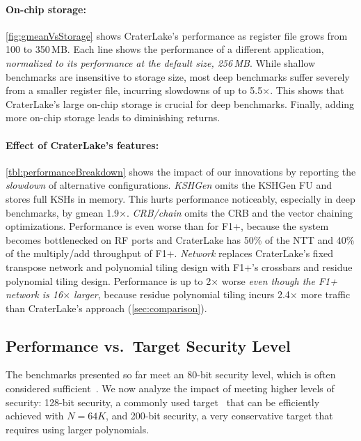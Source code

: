\paragraph{On-chip storage:}
\autoref{fig:gmeanVsStorage} shows CraterLake's performance as register file
grows from 100 to 350\,MB. Each line shows the performance of a different
application, \emph{normalized to its performance at the default size, 256\,MB}.
While shallow benchmarks are insensitive to storage size, most deep benchmarks
suffer severely from a smaller register file, incurring slowdowns of up to
5.5$\times$. This shows that CraterLake's large on-chip storage is crucial for
deep benchmarks. Finally, adding more on-chip storage leads to diminishing
returns.

\tblPerformanceBreakdown

\paragraph{Effect of CraterLake's features:}
\autoref{tbl:performanceBreakdown} shows the impact of our innovations by
reporting the \emph{slowdown} of alternative configurations. \emph{KSHGen}
omits the KSHGen FU and stores full KSHs in memory. This hurts performance
noticeably, especially in deep benchmarks, by gmean 1.9$\times$.
\emph{CRB/chain} omits the CRB and the vector chaining optimizations.
Performance is even worse than for F1+, because the system becomes bottlenecked
on RF ports and CraterLake has 50\% of the NTT and 40\% of the multiply/add
throughput of F1+. \emph{Network} replaces CraterLake's fixed transpose network
and polynomial tiling design with F1+'s crossbars and residue polynomial tiling
design. Performance is up to 2$\times$ worse \emph{even though the F1+ network
is 16$\times$ larger}, because residue polynomial tiling incurs 2.4$\times$
more traffic than CraterLake's approach (\autoref{sec:comparison}).

\subsection{Performance vs.\ Target Security Level}
\label{sec:moreSecurity}

The benchmarks presented so far meet an 80-bit security level, which is often
considered
sufficient~\cite{halevi2021bootstrapping,halevi2018faster,izabachene2019practical,ji2019efficient}.
We now analyze the impact of meeting higher levels of security: 128-bit
security, a commonly used
target~\cite{albrecht:hesg18:standard,lee:2021:privacy,riazi:asplos20:heax}
that can be efficiently achieved with $N =64K$, and 200-bit security, a very
conservative target that requires using larger polynomials.

